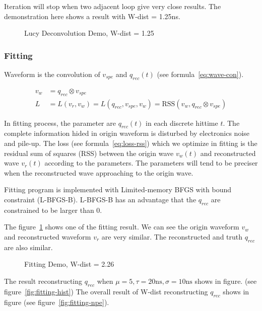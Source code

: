Iteration will stop when two adjacent loop give very close results. The demonstration here shows a result with W-dist = 1.25ns. 

\begin{figure}[H]
    \centering
    \scalebox{0.4}{}
    \caption{Lucy Deconvolution Demo, W-dist = 1.25}
\end{figure}

\subsubsection{Fitting}

Waveform is the convolution of $v_{spe}$ and $q_{rec}(t)$ (see formula~\eqref{eq:wave-con}). 

\begin{align}
    v_{w} &= q_{rec} \otimes v_{spe} \label{eq:wave-con} \\
    L &= L(v_{r}, v_{w}) = L(q_{rec}, v_{spe}, v_{w}) = \mathrm{RSS}(v_{w}, q_{rec} \otimes v_{spe}) \label{eq:loss-rss}
\end{align}

In fitting process, the parameter are $q_{rec}(t)$ in each discrete hittime $t$. The complete information hided in origin waveform is disturbed by electronics noise and pile-up. The loss (see formula~\ref{eq:loss-rss}) which we optimize in fitting is the residual sum of squares (RSS) between the origin wave $v_{w}(t)$ and reconstructed wave $v_{r}(t)$ according to the parameters. The parameters will tend to be preciser when the reconstructed wave approaching to the origin wave. 

Fitting program is implemented with Limited-memory BFGS with bound constraint \cite{byrd_limited_1995} (L-BFGS-B). L-BFGS-B has an advantage that the $q_{rec}$ are constrained to be larger than 0. 

The figure~\ref{fig:fitting} shows one of the fitting result. We can see the origin waveform $v_{w}$ and reconstructed waveform $v_{r}$ are very similar. The reconstructed and truth $q_{rec}$ are also similar. 

\begin{figure}[H]
    \centering
    \scalebox{0.4}{}
    \caption{\label{fig:fitting} Fitting Demo, W-dist = 2.26}
\end{figure}

The result reconstructing $q_{rec}$ when $\mu=5, \tau=20\mathrm{ns}, \sigma=10\mathrm{ns}$ shows in figure. (see figure~\ref{fig:fitting-hist}) The overall result of W-dist reconstructing $q_{rec}$ shows in figure (see figure~\ref{fig:fitting-npe}). 

